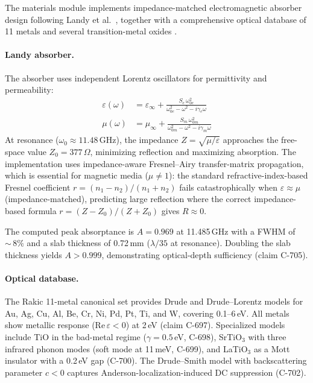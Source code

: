 \documentclass[12pt,openany]{report}
\theoremstyle{definition}
\theoremstyle{plain}
\theoremstyle{remark}
\begin{document}
The materials module implements impedance-matched electromagnetic
absorber design following Landy et al.\ \cite{Landy2008}, together with
a comprehensive optical database of 11 metals and several transition-metal
oxides \cite{Rakic1998}.

\paragraph{Landy absorber.}
The absorber uses independent Lorentz oscillators for permittivity and
permeability:
\begin{align}
  \varepsilon(\omega) &= \varepsilon_\infty +
    \frac{S_e\,\omega_{0e}^2}{\omega_{0e}^2 - \omega^2 - i\gamma_e\omega}
  \label{eq:lorentz-eps} \\
  \mu(\omega) &= \mu_\infty +
    \frac{S_m\,\omega_{0m}^2}{\omega_{0m}^2 - \omega^2 - i\gamma_m\omega}
  \label{eq:lorentz-mu}
\end{align}
At resonance ($\omega_0 \approx 11.48$\,GHz), the impedance
$Z = \sqrt{\mu/\varepsilon}$ approaches the free-space value $Z_0 = 377\,\Omega$,
minimizing reflection and maximizing absorption.  The
implementation uses impedance-aware Fresnel--Airy transfer-matrix
propagation, which is essential for magnetic media ($\mu \neq 1$):
the standard refractive-index-based Fresnel coefficient
$r = (n_1 - n_2)/(n_1 + n_2)$ fails catastrophically when
$\varepsilon \approx \mu$ (impedance-matched), predicting large
reflection where the correct impedance-based formula
$r = (Z - Z_0)/(Z + Z_0)$ gives $R \approx 0$.

The computed peak absorptance is $A = 0.969$ at 11.485\,GHz with a
FWHM of ${\sim}\,8\%$ and a slab thickness of 0.72\,mm
($\lambda/35$ at resonance).  Doubling the slab thickness yields
$A > 0.999$, demonstrating optical-depth sufficiency (claim C-705).

\paragraph{Optical database.}
The Rakic 11-metal canonical set \cite{Rakic1998} provides Drude
and Drude--Lorentz models for Au, Ag, Cu, Al, Be, Cr, Ni, Pd, Pt, Ti,
and W, covering 0.1--6\,eV.  All metals show metallic response
($\mathrm{Re}\,\varepsilon < 0$) at 2\,eV (claim C-697).  Specialized
models include TiO in the bad-metal regime ($\gamma = 0.5$\,eV,
C-698), SrTiO$_3$ with three infrared phonon modes (soft mode at
11\,meV, C-699), and LaTiO$_3$ as a Mott insulator with a 0.2\,eV
gap (C-700).  The Drude--Smith model with backscattering parameter
$c < 0$ captures Anderson-localization-induced DC suppression (C-702).
\end{document}
